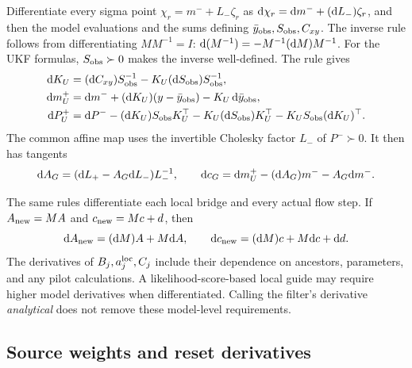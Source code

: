 Differentiate every sigma point
\(\chi_r=m^-+L_-\zeta_r\) as
\(\mathrm d\chi_r=\mathrm d m^-+(\mathrm d L_-)\zeta_r\), and then the model evaluations
and the sums defining \(\bar y_{\rm obs},S_{\rm obs},C_{xy}\).
The inverse rule follows from differentiating \(MM^{-1}=I\):
\(\mathrm d(M^{-1})=-M^{-1}(\mathrm d M)M^{-1}\).
For the UKF formulas, \(S_{\rm obs}\succ0\) makes the inverse
well-defined. The rule gives
\begin{align}
\label{eq:bf-covariance-proposal-ukf-tangent}
 \mathrm d K_U&=(\mathrm d C_{xy})S_{\rm obs}^{-1}
                -K_U(\mathrm d S_{\rm obs})S_{\rm obs}^{-1},\\
 \mathrm d m_U^+&=\mathrm d m^-+(\mathrm d K_U)(y-\bar y_{\rm obs})
                   -K_U\,\mathrm d\bar y_{\rm obs},\nonumber\\
 \mathrm d P_U^+&=\mathrm d P^--(\mathrm d K_U)S_{\rm obs}K_U^\top
                    -K_U(\mathrm d S_{\rm obs})K_U^\top
                    -K_US_{\rm obs}(\mathrm d K_U)^\top.\nonumber
\end{align}
The common affine map uses the invertible Cholesky factor \(L_-\)
of \(P^-\succ0\). It then has tangents
\begin{equation}
\label{eq:bf-covariance-proposal-global-tangent}
 \mathrm d A_G=(\mathrm d L_+-A_G\mathrm d L_-)L_-^{-1},\qquad
 \mathrm d c_G=\mathrm d m_U^+-(\mathrm d A_G)m^- -A_G\mathrm d m^-.
\end{equation}

The same rules differentiate each local bridge and every actual flow
step. If \(A_{\rm new}=MA\) and \(c_{\rm new}=Mc+d\), then
\[
 \mathrm d A_{\rm new}=(\mathrm d M)A+M\mathrm d A,\qquad
 \mathrm d c_{\rm new}=(\mathrm d M)c+M\mathrm d c+\mathrm d d .
\]
The derivatives of \(B_j,a_j^{\rm loc},C_j\) include their dependence on
ancestors, parameters, and any pilot calculations. A likelihood-score-based
local guide may require higher model derivatives when differentiated.
Calling the filter's derivative \emph{analytical} does not remove these
model-level requirements.

\subsection{Source weights and reset derivatives}

